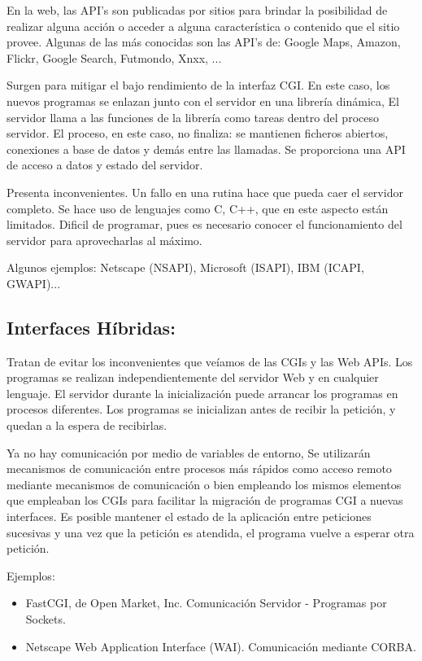 \documentclass{apuntes}
\begin{document}
En la web, las API's son publicadas por sitios para brindar la posibilidad de realizar alguna acción o acceder a alguna característica o contenido que el sitio provee. Algunas de las más conocidas son las API's de: Google Maps, Amazon, Flickr, Google Search, Futmondo, Xnxx, ...

Surgen para mitigar el bajo rendimiento de la interfaz CGI. En este caso, los nuevos programas se enlazan junto con el servidor en una librería dinámica, El servidor llama a las funciones de la librería como tareas dentro del proceso servidor. El proceso, en este caso, no finaliza: se mantienen ficheros abiertos, conexiones a base de datos y demás entre las llamadas. Se proporciona una API de acceso a datos y estado del servidor.

Presenta inconvenientes. Un fallo en una rutina hace que pueda caer el servidor completo. Se hace uso de lenguajes como C, C++, que en este aspecto están limitados. Dificil de programar, pues es necesario conocer el funcionamiento del servidor para aprovecharlas al máximo.

Algunos ejemplos: Netscape (NSAPI), Microsoft (ISAPI), IBM (ICAPI, GWAPI)...

\subsection{Interfaces Híbridas:}
Tratan de evitar los inconvenientes que veíamos de las CGIs y las Web APIs.
Los programas se realizan independientemente del servidor Web y en cualquier lenguaje.
El servidor durante la inicialización puede arrancar los programas en procesos diferentes.
Los programas se inicializan antes de recibir la petición, y quedan a la espera de recibirlas.

Ya no hay comunicación por medio de variables de entorno, Se utilizarán mecanismos de comunicación entre procesos más rápidos como acceso remoto mediante mecanismos de comunicación o bien empleando los mismos elementos que empleaban los CGIs para facilitar la migración de programas CGI a nuevas interfaces.
Es posible mantener el estado de la aplicación entre peticiones sucesivas y una vez que la petición es atendida, el programa vuelve a esperar otra petición.

\newpage
Ejemplos:
\begin{itemize}
\item FastCGI, de Open Market, Inc. Comunicación Servidor - Programas por Sockets.
\item Netscape Web Application Interface (WAI). Comunicación mediante CORBA.
\end{itemize}
\end{document}
